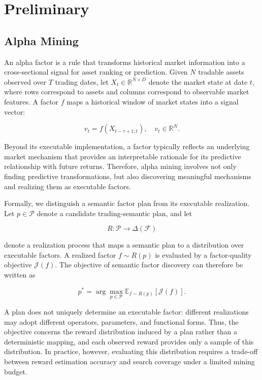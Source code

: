 \section{Preliminary}
\label{sec:preliminary}

\subsection{Alpha Mining}

An alpha factor is a rule that transforms historical market information
into a cross-sectional signal for asset ranking or prediction. Given
\(N\) tradable assets observed over \(T\) trading dates, let
\(X_t\in\mathbb{R}^{N\times D}\) denote the market state at date \(t\),
where rows correspond to assets and columns correspond to observable
market features. A factor \(f\) maps a historical window of market
states into a signal vector:

\[
v_t=f(X_{t-\tau+1:t}),\quad v_t\in\mathbb{R}^{N}.
\]

Beyond its executable implementation, a factor typically reflects an
underlying market mechanism that provides an interpretable rationale
for its predictive relationship with future returns. Therefore, alpha
mining involves not only finding predictive transformations, but also
discovering meaningful mechanisms and realizing them as executable
factors.

Formally, we distinguish a semantic factor plan from its executable
realization. Let \(p\in\mathcal{P}\) denote a candidate trading-semantic
plan, and let

\[
R:\mathcal{P}\rightarrow\Delta(\mathcal{F})
\]

denote a realization process that maps a semantic plan to a distribution
over executable factors. A realized factor \(f\sim R(p)\) is evaluated by
a factor-quality objective \(\mathcal{J}(f)\). The objective of semantic
factor discovery can therefore be written as

\[
p^*=\arg\max_{p\in\mathcal{P}}
\mathbb{E}_{f\sim R(p)}[\mathcal{J}(f)].
\]

A plan does not uniquely determine an executable factor: different
realizations may adopt different operators, parameters, and functional
forms. Thus, the objective concerns the reward distribution induced by a plan rather than a deterministic mapping, and each observed reward provides only a sample of this distribution. In practice, however, evaluating this distribution requires a trade-off between reward estimation accuracy and search coverage under a limited mining budget.

